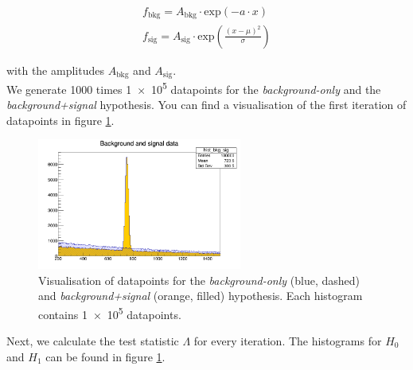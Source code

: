 \documentclass[10pt]{article}
\newenvironment{myfont}{\fontfamily{put}\selectfont}{\par}
\begin{document}
\begin{myfont}
\begin{align}
f_{\textrm{bkg}} = A_{\textrm{bkg}} \cdot \textrm{exp}(- a \cdot x) \\
f_{\textrm{sig}} = A_{\textrm{sig}} \cdot \textrm{exp}\left(\frac{(x - \mu)^{2}}{\sigma}\right)
\end{align}

\noindent with the amplitudes $A_{\textrm{bkg}}$ and $A_{\textrm{sig}}$. \\
We generate \num{1000} times \num{1e5} datapoints for the \textit{background-only} and the \textit{background+signal} hypothesis.
You can find a visualisation of the first iteration of datapoints in figure \ref{fig:ex9_iter}.

\begin{figure}[H]
  \centering
  \includegraphics[width = 0.6\textwidth]{./exercise09_MCdata.png}
  \caption{Visualisation of datapoints for the \textit{background-only} (blue, dashed) and \textit{background+signal} (orange, filled) hypothesis.
  Each histogram contains \num{1e5} datapoints.}
  \label{fig:ex9_iter}
\end{figure}

\noindent Next, we calculate the test statistic $\Lambda$ for every iteration.
The histograms for $H_{0}$ and $H_{1}$ can be found in figure \ref{fig:ex9_iter}. %



\end{myfont}
\end{document}
